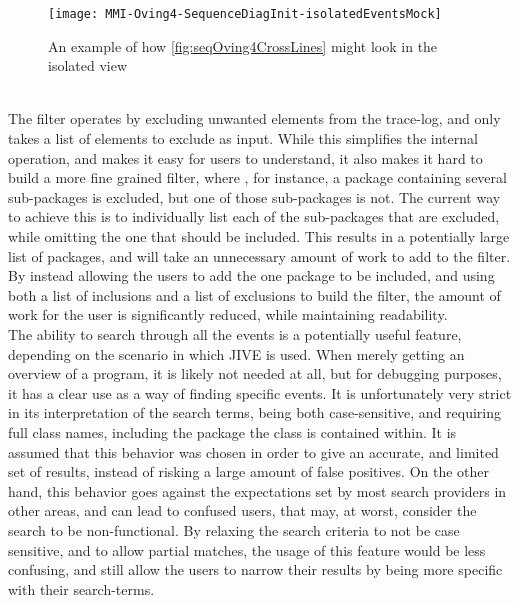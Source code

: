 \begin{figure}[H]
	\centering
	\texttt{[image: MMI-Oving4-SequenceDiagInit-isolatedEventsMock]}
	\caption{An example of how \autoref{fig:seqOving4CrossLines} might look in the isolated view}
	\label{fig:seqOving4IsolatedMock}
\end{figure}
~\\

The filter operates by excluding unwanted elements from the trace-log, and only takes a list of elements to exclude as input.
While this simplifies the internal operation, and makes it easy for users to understand, it also makes it hard to build a more fine grained filter, where , for instance, a package containing several sub-packages is excluded, but one of those sub-packages is not.
The current way to achieve this is to individually list each of the sub-packages that are excluded, while omitting the one that should be included.
This results in a potentially large list of packages, and will take an unnecessary amount of work to add to the filter.
By instead allowing the users to add the one package to be included, and using both a list of inclusions and a list of exclusions to build the filter, the amount of work for the user is significantly reduced, while maintaining readability.
~\\%

The ability to search through all the events is a potentially useful feature, depending on the scenario in which JIVE is used.
When merely getting an overview of a program, it is likely not needed at all, but for debugging purposes, it has a clear use as a way of finding specific events.
It is unfortunately very strict in its interpretation of the search terms, being both case-sensitive, and requiring full class names, including the package the class is contained within.
It is assumed that this behavior was chosen in order to give an accurate, and limited set of results, instead of risking a large amount of false positives.
On the other hand, this behavior goes against the expectations set by most search providers in other areas, and can lead to confused users, that may, at worst, consider the search to be non-functional.
By relaxing the search criteria to not be case sensitive, and to allow partial matches, the usage of this feature would be less confusing, and still allow the users to narrow their results by being more specific with their search-terms.
~\\






